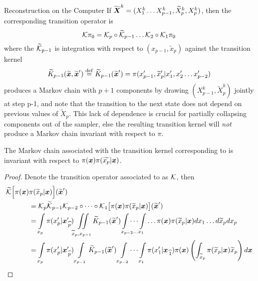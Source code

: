 \begin{chapter}{Reconstruction on the Computer}
If $\widetilde{\mbox{\boldmath$X$}}^k = (X_1^k\dots X_{p-1}^k,\widetilde X_{p}^k,X_p^k)$, then the corresponding transition operator is
\begin{equation}
  \mathcal K\pi_0 = \mathcal K_p\circ \widetilde {\mathcal K}_{p-1}\dots \mathcal K_2\circ \mathcal K_1 \pi_0
\end{equation}
where the $\widetilde{\mathcal K}_{p-1}$ is integration with respect to $(x_{p-1},\tilde x_p)$ against the transition kernel
\begin{equation}
  \widetilde K_{p-1}(\widetilde{\mbox{\boldmath$x$}},\widetilde{\mbox{\boldmath$x$}}') \stackrel{\rm def}{=} \widetilde K_{p-1}(\widetilde{\mbox{\boldmath$x$}}') = \pi(x_{p-1}',\widetilde x_p'|x_1',x_2'\dots x_{p-2}')
\end{equation}
 produces a Markov chain with $p+1$ components by drawing $(X_{p-1}^k,\tilde X_p^k)$ jointly at step p-1, and note that the transition to the next state does not depend on previous values of $\tilde X_p$.
This lack of dependence is crucial for partially collapsing components out of the sampler, else the resulting transition kernel will \emph{not} produce a Markov chain invariant with respect to $\pi$.
\begin{prop}\label{thm:conditionedGibbsStationary}
  The Markov chain associated with the transition kernel corresponding to  is invariant with respect to $\pi(\mbox{\boldmath$x$})\pi(\widetilde{x_p}|\mbox{\boldmath$x$})$.
\end{prop}
\begin{proof}
  Denote the transition operator associated to  as $\mathcal K$, then
  \begin{align}
    \tilde\K\Big[ \pi(\vect x)&\pi(\tilde x_p|\vect x)\Big](\tilde{\vect x}') \nonumber \\ 
    &= \K_p \tilde\K_{p-1} \K_{p-2}\circ\dots\circ\K_{1} \big[\pi(\vect x)\pi(\tilde x_p|\vect x)\big](\tilde{\vect x}') \nonumber\\
    &= \int\limits_{x_p} \pi(x_p'|\rem xp')\iint\limits_{\tilde x_p,x_{p-1}}\tilde K_{p-1}(\tilde{\vect x}')\idotsint\limits_{x_{p-2}\dots x_1}\dots \pi(\vect x)\pi(\tilde x_p|\vect x)dx_1\dots d\tilde x_p dx_p \nonumber\\
    &=\int\limits_{x_p}\pi(x_p'|\rem xp') \int\limits_{x_{p-1}}\tilde K_{p-1}(\tilde{\vect x}')\int\limits_{x_{p-2}}\dots \int\limits_{x_1}\pi(x_1'|\rem x1)\pi(\vect x)\left(\int_{\tilde x_p}\pi(\tilde x_p|\vect x)\tilde x_p \right)d\vect x \label{eq:conditionedGibbsCalc}

\end{align}
\end{proof}
\end{chapter}
